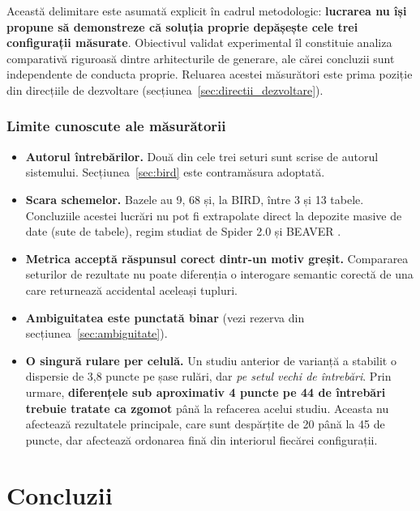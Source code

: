 \documentclass[12pt,a4paper]{report}
\begin{document}
Această delimitare este asumată explicit în cadrul metodologic: \textbf{lucrarea nu
își propune să demonstreze că soluția proprie depășește cele trei configurații măsurate}. Obiectivul
validat experimental îl constituie analiza comparativă riguroasă dintre arhitecturile de generare,
ale cărei concluzii sunt independente de conducta proprie. Reluarea acestei măsurători este
prima poziție din direcțiile de dezvoltare (secțiunea~\ref{sec:directii_dezvoltare}).

\subsection{Limite cunoscute ale măsurătorii}

\begin{itemize}[nosep,leftmargin=*]
  \item \textbf{Autorul întrebărilor.} Două din cele trei seturi sunt scrise
    de autorul sistemului. Secțiunea~\ref{sec:bird} este contramăsura adoptată.
  \item \textbf{Scara schemelor.} Bazele au 9, 68 și, la BIRD, între 3 și 13
    tabele. Concluziile acestei lucrări nu pot fi extrapolate direct la depozite masive de date
    (sute de tabele), regim studiat de Spider 2.0 \cite{spider2} și
    BEAVER \cite{beaver}.
  \item \textbf{Metrica acceptă răspunsul corect dintr-un motiv greșit.} Compararea
    seturilor de rezultate nu poate diferenția o interogare semantic corectă de una care
    returnează accidental aceleași tupluri.
  \item \textbf{Ambiguitatea este punctată binar} (vezi rezerva din secțiunea~\ref{sec:ambiguitate}).
  \item \textbf{O singură rulare per celulă.} Un studiu anterior de varianță a
    stabilit o dispersie de 3,8 puncte pe șase rulări, dar \emph{pe setul
    vechi de întrebări}. Prin urmare, \textbf{diferențele sub aproximativ 4
    puncte pe 44 de întrebări trebuie tratate ca zgomot} până la refacerea
    acelui studiu. Aceasta nu afectează rezultatele principale, care sunt
    despărțite de 20 până la 45 de puncte, dar afectează ordonarea fină din
    interiorul fiecărei configurații.
\end{itemize}

\chapter{Concluzii}
\label{chap:concluzii}
\end{document}
